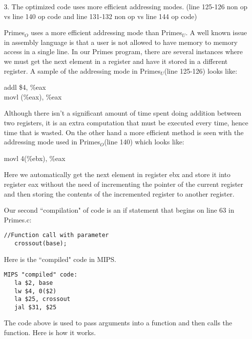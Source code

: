 \documentclass[11pt]{article}
\begin{document}
3. The optimized code uses more efficient addressing modes. (line 125-126 non op vs line 140 op code and line 131-132 non op vs line 144 op code)

Primes$_{O}$ uses a more efficient addressing mode than Primes$_{U}$. A well known issue in assembly language is that a user is not allowed to have memory to memory access in a single line. In our Primes program, there are several instances where we must get the next element in a register and have it stored in a different register. A sample of the addressing mode in Primes$_{U}$(line 125-126) looks like:


\hspace*{2.2in} addl \$4, \%eax \\

\hspace*{2.2in} movl (\%eax), \%eax 


Although there isn't a significant amount of time spent doing addition between two registers, it is an extra computation that must be executed every time, hence time that is wasted. On the other hand a more efficient method is seen with the addressing mode used in Primes$_{O}$(line 140) which looks like: 


\hspace*{2.2in} movl 4(\%ebx), \%eax


Here we automatically get the next element in register ebx and store it into register eax without the need of incrementing the pointer of the current register and then storing the contents of the incremented register to another register.




Our second ``compilation" of code is an if statement that begins on line 63 in Primes.c:
\begin{verbatim}
//Function call with parameter
   crossout(base);
\end{verbatim}

Here is the ``compiled" code in MIPS.

\begin{verbatim}
MIPS "compiled" code:
   la $2, base
   lw $4, 0($2)
   la $25, crossout
   jal $31, $25
\end{verbatim}

The code above is used to pass arguments into a function and then calls the function. Here is how it works. 
\end{document}
